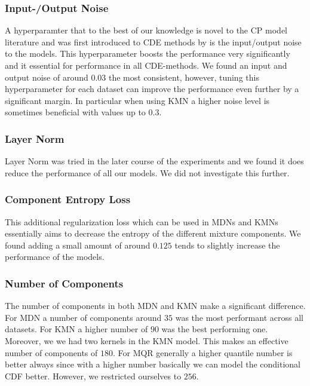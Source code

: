 \subsubsection{Input-/Output Noise}

A hyperparamter that to the best of our knowledge is novel to the CP model literature and was first introduced to CDE methods by \cite{rothfuss2019noise} is the input/output noise to the models. This hyperparameter boosts the performance very significantly and it essential for performance in all CDE-methods. We found an input and output noise of around $0.03$ the most consistent, however, tuning this hyperparameter for each dataset can improve the performance even further by a significant margin. In particular when using KMN a higher noise level is sometimes beneficial with values up to $0.3$.

\subsubsection{Layer Norm}

Layer Norm was tried in the later course of the experiments and we found it does reduce the performance of all our models. We did not investigate this further.

\subsubsection{Component Entropy Loss}

This additional regularization loss which can be used in MDNs and KMNs essentially aims to decrease the entropy of the different mixture components. We found adding a small amount of around $0.125$ tends to slightly increase the performance of the models.

\subsubsection{Number of Components}

The number of components in both MDN and KMN make a significant difference. For MDN a number of components around $35$ was the most performant across all datasets. For KMN a higher number of $90$ was the best performing one. Moreover, we we had two kernels in the KMN model. This makes an effective number of components of $180$. For MQR generally a higher quantile number is better always since with a higher number basically we can model the conditional CDF better. However, we restricted ourselves to $256$.


